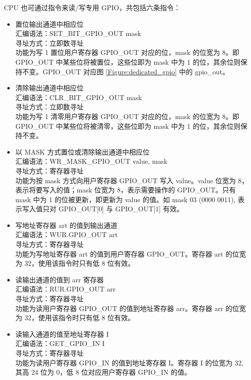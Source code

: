 \documentclass[main\_\_CN.tex]{subfiles}
\begin{document}
CPU 也可通过指令来读/写专用 GPIO，共包括六条指令：
\begin{itemize}
    \item 置位输出通道中相应位\\
    汇编语法：SET\_BIT\_GPIO\_OUT mask  \\
    寻址方式：立即数寻址 \\
功能为写 1 置位用户寄存器 GPIO\_OUT 对应的位，mask 的位宽为 8。即 GPIO\_OUT 中某些位将被置位，这些位即为 mask 中为 1 的位，其余位则保持不变。GPIO\_OUT 对应图 \ref{Figure:dedicated_gpio} 中的 gpio\_out。
    \item 清除输出通道中相应位\\
    汇编语法：CLR\_BIT\_GPIO\_OUT mask \\
    寻址方式：立即数寻址 \\
功能为写 1 清零用户寄存器 GPIO\_OUT 对应的位，mask 的位宽为 8。即 GPIO\_OUT 中某些位将被清零，这些位即为 mask 中为 1 的位，其余位则保持不变。
    \item 以 MASK 方式置位或清除输出通道中相应位\\
    汇编语法：WR\_MASK\_GPIO\_OUT value, mask \\
    寻址方式：寄存器寻址 \\
功能为按 mask 方式向用户寄存器 GPIO\_OUT 写入 value。value 位宽为 8，表示将要写入的值；mask 位宽为 8，表示需要操作的 GPIO\_OUT。只有 mask 中为 1 的位被更新，即更新为 value 的值。如 mask \hexprefix{}03 (0000 0011), 表示写入值只对 GPIO\_OUT[0] 与 GPIO\_OUT[1] 有效。
    \item 写地址寄存器 art 的值到输出通道\\
    汇编语法：WUR.GPIO\_OUT art \\
    寻址方式：寄存器寻址 \\
功能为写地址寄存器 art 的值到用户寄存器 GPIO\_OUT。寄存器 art 的位宽为 32，使用该指令时只有低 8 位有效。
    \item 读输出通道的值到 arr 寄存器\\
    汇编语法：RUR.GPIO\_OUT arr \\
    寻址方式：寄存器寻址 \\
功能为读用户寄存器 GPIO\_OUT 的值到地址寄存器 arr。寄存器 arr 的位宽为 32，使用该指令时只有低 8 位有效。
    \item 读输入通道的值至地址寄存器 I \\
    汇编语法：GET\_GPIO\_IN I \\
    寻址方式：寄存器寻址 \\
功能为读用户寄存器 GPIO\_IN 的值到地址寄存器 I。寄存器 I 的位宽为 32, 其高 24 位为 0，低 8 位对应用户寄存器 GPIO\_IN 的值。
\end{itemize}
\end{document}
